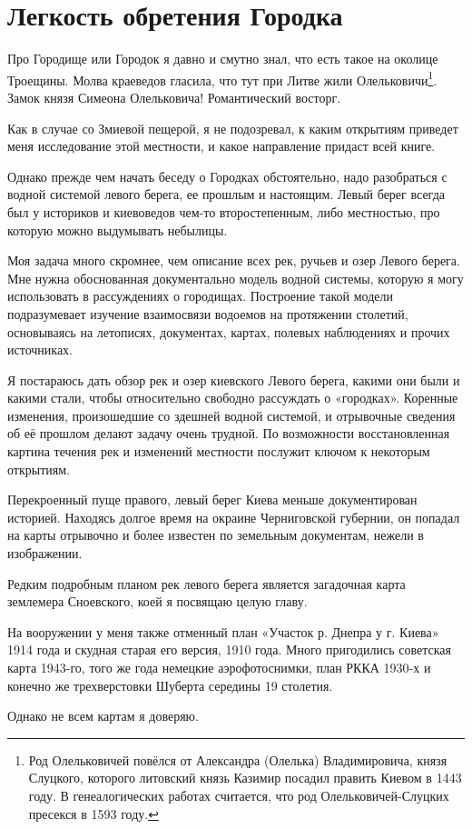 \chapter{Легкость обретения Городка}


Про Городище или Городок я давно и смутно знал, что есть такое на околице Троещины. Молва краеведов гласила, что тут при Литве жили Олельковичи\footnote{Род Олельковичей повёлся от Александра (Олелька) Владимировича, князя Слуцкого, которого литовский князь Казимир посадил править Киевом в 1443 году. В генеалогических работах считается, что род Олельковичей-Слуцких пресекся в 1593 году.}. Замок князя Симеона Олельковича! Романтический восторг.

Как в случае со Змиевой пещерой, я не подозревал, к каким открытиям приведет меня исследование этой местности, и какое направление придаст всей книге.

Однако прежде чем начать беседу о Городках обстоятельно, надо разобраться с водной системой левого берега, ее прошлым и настоящим. Левый берег всегда был у историков и киевоведов чем-то второстепенным, либо местностью, про которую можно выдумывать небылицы. 

Моя задача много скромнее, чем описание всех рек, ручьев и озер Левого берега. Мне нужна обоснованная документально модель водной системы, которую я могу использовать в рассуждениях о городищах. Построение такой модели подразумевает изучение взаимосвязи водоемов на протяжении столетий, основываясь на летописях, документах, картах, полевых наблюдениях и прочих источниках.

Я постараюсь дать обзор рек и озер киевского Левого берега, какими они были и какими стали, чтобы относительно свободно рассуждать о «городках». Коренные изменения, произошедшие со здешней водной системой, и отрывочные сведения об её прошлом делают задачу очень трудной. По возможности восстановленная картина течения рек и изменений местности послужит ключом к некоторым открытиям.

Перекроенный пуще правого, левый берег Киева меньше документирован историей. Находясь долгое время на окраине Черниговской губернии, он попадал на карты отрывочно и более известен по земельным документам, нежели в изображении. 

Редким подробным планом рек левого берега является загадочная карта землемера Сноевского, коей я посвящаю целую главу.

На вооружении у меня также отменный план «Участок р. Днепра у г. Киева» 1914 года и скудная старая его версия, 1910 года. Много пригодились советская карта 1943-го, того же года немецкие аэрофотоснимки, план РККА 1930-х и конечно же трехверстовки Шуберта середины 19 столетия.

Однако не всем картам я доверяю.

